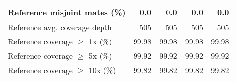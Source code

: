 \documentclass[12pt,a4paper]{article}
\begin{document}
\begin{table}[ht]
\begin{center}
\begin{tabular}{|l*{4}{|r}|}
Reference misjoint mates (\%) & 0.0 & 0.0 & 0.0 & 0.0 \\ \hline
Reference avg. coverage depth & 505 & 505 & 505 & 505 \\ \hline
Reference coverage $\geq$ 1x (\%) & 99.98 & 99.98 & 99.98 & 99.98 \\ \hline
Reference coverage $\geq$ 5x (\%) & 99.92 & 99.92 & 99.92 & 99.92 \\ \hline
Reference coverage $\geq$ 10x (\%) & 99.82 & 99.82 & 99.82 & 99.82 \\ \hline
\end{tabular}
\end{center}
\end{table}
\end{document}
